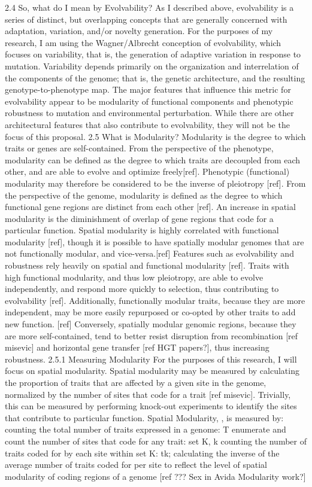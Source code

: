 2.4 So, what do I mean by Evolvability?
As I described above, evolvability is a series of distinct, but overlapping concepts that are generally concerned with adaptation, variation, and/or novelty generation. For the purposes of my research, I am using the Wagner/Albrecht conception of evolvability, which focuses on variability, that is, the generation of adaptive variation in response to mutation. Variability depends primarily on the organization and interrelation of the components of the genome; that is, the genetic architecture, and the resulting genotype-to-phenotype map.
The major features that influence this metric for evolvability appear to be modularity of functional components and phenotypic robustness to mutation and environmental perturbation. While there are other architectural features that also contribute to evolvability, they will not be the focus of this proposal.
2.5 What is Modularity?
Modularity is the degree to which traits or genes are self-contained. From the perspective of the phenotype, modularity can be defined as the degree to which traits are decoupled from each other, and are able to evolve and optimize freely[ref]. Phenotypic (functional) modularity may therefore be considered to be the inverse of pleiotropy [ref].
From the perspective of the genome, modularity is defined as the degree to which functional gene regions are distinct from each other [ref]. An increase in spatial modularity is the diminishment of overlap of gene regions that code for a particular function. Spatial modularity is highly correlated with functional modularity [ref], though it is possible to have spatially modular genomes that are not functionally modular, and vice-versa.[ref]
Features such as evolvability and robustness rely heavily on spatial and functional modularity [ref]. Traits with high functional modularity, and thus low pleiotropy, are able to evolve independently, and respond more quickly to selection, thus contributing to evolvability [ref]. Additionally, functionally modular traits, because they are more independent, may be more easily repurposed or co-opted by other traits to add new function. [ref]  Conversely, spatially modular genomic regions, because they are more self-contained, tend to better resist disruption from recombination [ref misevic] and horizontal gene transfer [ref HGT papers?], thus increasing robustness.
2.5.1 Measuring Modularity
For the purposes of this research, I will focus on spatial modularity. Spatial modularity may be measured by calculating the proportion of traits that are affected by a given site in the genome, normalized by the number of sites that code for a trait [ref misevic]. Trivially, this can be measured by performing knock-out experiments to identify the sites that contribute to particular function.
Spatial Modularity, , is measured by:
counting the total number of traits expressed in a genome: T
enumerate and count the number of sites that code for any trait: set K, k
counting the number of traits coded for by each site within set K: tk;
calculating the inverse of the average number of traits coded for per site to reflect the level of spatial modularity of coding regions of a genome [ref ??? Sex in Avida Modularity work?]

